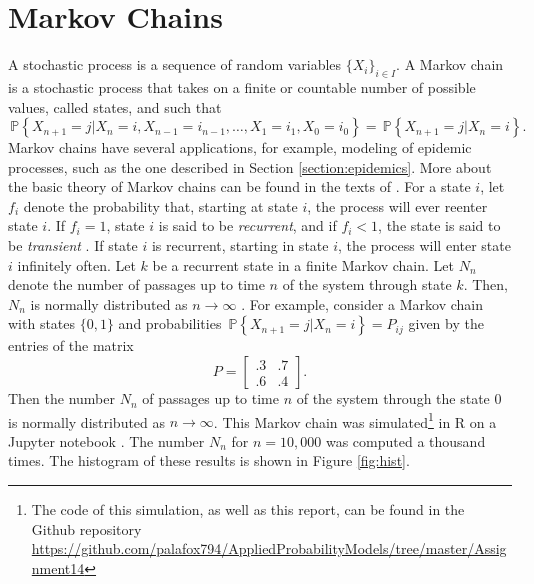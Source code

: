\documentclass[letterpaper, 10 pt, conference]{article}
\newcommand\pr[1]{\, \mathbb{P} \left\lbrace #1 \right\rbrace}
\begin{document}
\section{Markov Chains}\label{section:markov}
A stochastic process is a sequence of random variables $\lbrace X_i \rbrace_{i \in I}$. A Markov chain is a stochastic process that takes on a finite or countable number of possible values, called states, and such that 
\begin{equation}
	\pr{X_{n+1} = j | X_{n} = i, X_{n-1} = i_{n-1} , \dots, X_1 = i_1, X_0 = i_0} = \pr{X_{n+1} = j | X_{n} = i}.
\end{equation}
Markov chains have several applications, for example, modeling of epidemic processes, such as the one described in Section \ref{section:epidemics}. More about the basic theory of Markov chains can be found in the texts of \citet{Ross_2000, feller, lawler_2006}. For a state $i$, let $f_i$ denote the probability that, starting at state $i$, the process will ever reenter state $i$. If $f_i = 1$, state $i$ is said to be \textit{recurrent}, and if $f_i < 1$, the state is said to be \textit{transient} . If state $i$ is recurrent, starting in state $i$, the process will enter state $i$ infinitely often.
Let $k$ be a recurrent state in a finite Markov chain. Let $N_n$ denote the number of passages up to time $n$ of the system through state $k$. Then, $N_n$ is normally distributed as $n \rightarrow \infty$ \citep{feller}. For example, consider a Markov chain with states $\lbrace 0, 1 \rbrace$ and probabilities $\pr{X_{n+1} = j | X_{n} = i} = P_{ij}$ given by the entries of the matrix
\begin{equation}
P = 
	\begin{bmatrix}
	.3 & .7 \\
	.6 & .4
	\end{bmatrix}.
\end{equation}
Then the number $N_{n}$ of passages up to time $n$ of the system through the state 0 is normally distributed as $n \rightarrow \infty$. This Markov chain was simulated\footnote{The code of this simulation, as well as this report, can be found in the Github repository \url{https://github.com/palafox794/AppliedProbabilityModels/tree/master/Assignment14}} in R \citep{R} on a Jupyter notebook \citep{jupyter}. The number $N_n$ for $n = 10,000$ was computed a thousand times. The histogram of these results is shown in Figure \ref{fig:hist}.
\end{document}
